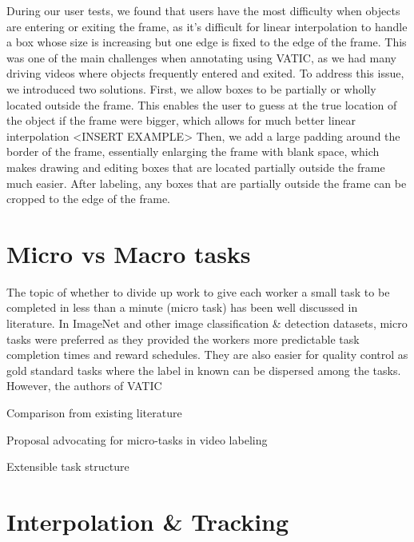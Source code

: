 During our user tests, we found that users have the most difficulty when objects are entering or exiting the frame, as it's difficult for linear interpolation to handle a box whose size is increasing but one edge is fixed to the edge of the frame. 
This was one of the main challenges when annotating using VATIC, as we had many driving videos where objects frequently entered and exited.
To address this issue, we introduced two solutions.
First, we allow boxes to be partially or wholly located outside the frame. 
This enables the user to guess at the true location of the object if the frame were bigger, which allows for much better linear interpolation <INSERT EXAMPLE>
Then, we add a large padding around the border of the frame, essentially enlarging the frame with blank space, which makes drawing and editing boxes that are located partially outside the frame much easier. 
After labeling, any boxes that are partially outside the frame can be cropped to the edge of the frame.

\section{Micro vs Macro tasks}

The topic of whether to divide up work to give each worker a small task to be completed in less than a minute (micro task) has been well discussed in literature. 
In ImageNet and other image classification \& detection datasets, micro tasks were preferred as they provided the workers more predictable task completion times and reward schedules. 
They are also easier for quality control as gold standard tasks where the label in known can be dispersed among the tasks. 
However, the authors of VATIC 

Comparison from existing literature

Proposal advocating for micro-tasks in video labeling

Extensible task structure

\section{Interpolation \& Tracking}
